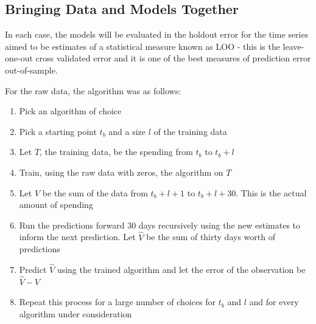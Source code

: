 \documentclass[11pt,a4paper]{article}
\begin{document}
\subsection{Bringing Data and Models Together}
In each case, the models will be evaluated in the holdout error for the time series aimed to be estimates of a statistical measure known as \textsc{LOO} - this is the leave-one-out cross validated error and it is one of the best measures of prediction error out-of-sample.

For the raw data, the algorithm was as follows:
\begin{enumerate}
	\item Pick an algorithm of choice
	\item Pick a starting point $ t_b $ and a size $ l $ of the training data
	\item Let $ T $, the training data, be the spending from $ t_b $ to $ t_b + l $
	\item Train, using the raw data with zeros, the algorithm on $ T $
	\item Let $ V $ be the sum of the data from $ t_b + l + 1 $ to $ t_b + l + 30 $. This is the actual amount of spending
	\item Run the predictions forward 30 days recursively using the new estimates to inform the next prediction. Let $ \hat{V} $ be the sum of thirty days worth of predictions
	\item Predict $ \hat{V} $ using the trained algorithm and let the error of the observation be $ \hat{V} - V $
	\item Repeat this process for a large number of choices for $ t_b $ and $ l $ and for every algorithm under consideration
\end{enumerate}
\end{document}
